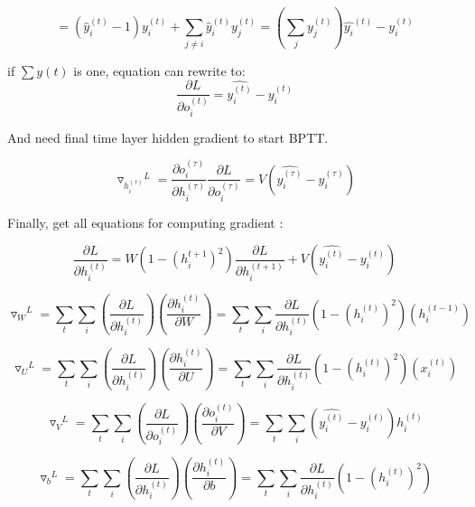 \documentclass[12pt]{article}
\begin{document}
$$
= (\hat{y}_i^{(t)} - 1) y_i^{(t)} + \sum_{j\neq i} \hat{y}_i^{(t)}y_j^{(t)}
= ( \sum_j y_j^{(t)} ) \hat{y_i}^{(t)} - y_i^{(t)}
$$

if $\sum y{(t)}$ is one, equation can rewrite to:
\begin{equation}\label{grad:crossentropy}
\frac{\partial L}{\partial o_i^{(t)}} = \hat{y_i^{(t)}} - y_i^{(t)}   
\end{equation}

And need final time layer hidden gradient to start BPTT.

\begin{equation}
{\triangledown_{h_i^{(\tau)}}}^L = \frac{\partial o_i^{(\tau)}}{\partial h_i^{(\tau)}} \frac{\partial L}{\partial o_i^{(\tau)}} = V(\hat{y_i^{(\tau)}} - y_i^{(\tau)})
\end{equation}

Finally, get all equations for computing gradient : 

\begin{equation}
\frac{\partial L}{\partial h_i^{(t)}} = W(1 - (h_i^{t+1})^2) \frac{\partial L}{\partial h_i^{(t+1)}} + V(\hat{y_i^{(t)}} - y_i^{(t)})    
\end{equation}

\begin{equation}
{\triangledown_W}^L = \sum_t \sum_i (\frac{\partial L}{\partial h_i^{(t)}}) (\frac{\partial h_i^{(t)}}{\partial W}) = \sum_t \sum_i \frac{\partial L}{\partial h_i^{(t)}} (1 - (h_i^{(t)})^2)(h_i^{(t-1)})
\end{equation}

\begin{equation}
{\triangledown_U}^L = \sum_t \sum_i (\frac{\partial L}{\partial h_i^{(t)}}) (\frac{\partial h_i^{(t)}}{\partial U}) = \sum_t \sum_i \frac{\partial L}{\partial h_i^{(t)}} (1 - (h_i^{(t)})^2)(x_i^{(t)})
\end{equation}

\begin{equation}
{\triangledown_V}^L =  \sum_t \sum_i (\frac{\partial L}{\partial o_i^{(t)}}) (\frac{\partial o_i^{(t)}}{\partial V}) = \sum_t \sum_i (\hat{y_i^{(t)}} - y_i^{(t)}) h_i^{(t)} 
\end{equation}

\begin{equation}
{\triangledown_b}^L = \sum_t \sum_i (\frac{\partial L}{\partial h_i^{(t)}}) (\frac{\partial h_i^{(t)}}{\partial b}) = \sum_t \sum_i \frac{\partial L}{\partial h_i^{(t)}} (1 - (h_i^{(t)})^2)    
\end{equation}
\end{document}

